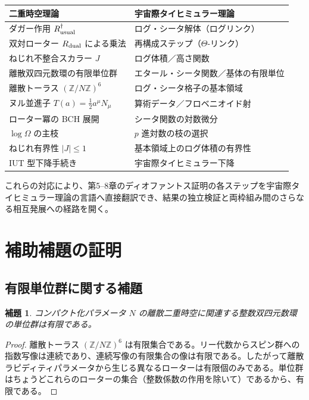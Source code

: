\documentclass[a4paper]{article}
\newtheorem{lemma}[theorem]{補題}
\theoremstyle{definition}
\begin{document}
\begin{center}
\begingroup
\renewcommand{\arraystretch}{1.5}
\begin{tabular}{@{}p{6.5cm}p{6.5cm}@{}}
\toprule
\textbf{二重時空理論} & \textbf{宇宙際タイヒミュラー理論} \\
\midrule
ダガー作用 $R_{\rm usual}^\dagger$ & ログ・シータ解体（ログリンク） \\
双対ローター $R_{\rm dual}$ による乗法 & 再構成ステップ（$\Theta$-リンク） \\
ねじれ不整合スカラー $J$ & ログ体積／高さ関数 \\
離散双四元数環の有限単位群 & エタール・シータ関数／基体の有限単位 \\
離散トーラス $(\mathbb{Z}/N\mathbb{Z})^6$ & ログ・シータ格子の基本領域 \\
ヌル並進子 $T(a) = \frac12 a^\mu N_\mu$ & 算術データ／フロベニオイド射 \\
ローター冪の BCH 展開 & シータ関数の対数微分 \\
$\log \Omega$ の主枝 & $p$ 進対数の枝の選択 \\
ねじれ有界性 $|J| \leq 1$ & 基本領域上のログ体積の有界性 \\
IUT 型下降手続き & 宇宙際タイヒミュラー下降 \\
\bottomrule
\end{tabular}
\endgroup
\end{center}

これらの対応により、第5--8章のディオファントス証明の各ステップを宇宙際タイヒミュラー理論の言語へ直接翻訳でき、結果の独立検証と両枠組み間のさらなる相互発展への経路を開く。

\section{補助補題の証明}

\subsection{有限単位群に関する補題}

\begin{lemma}
コンパクト化パラメータ $N$ の離散二重時空に関連する整数双四元数環の単位群は有限である。
\end{lemma}

\begin{proof}
離散トーラス $(\mathbb{Z}/N\mathbb{Z})^6$ は有限集合である。リー代数からスピン群への指数写像は連続であり、連続写像の有限集合の像は有限である。したがって離散ラピディティパラメータから生じる異なるローターは有限個のみである。単位群はちょうどこれらのローターの集合（整数係数の作用を除いて）であるから、有限である。
\end{proof}
\end{document}
